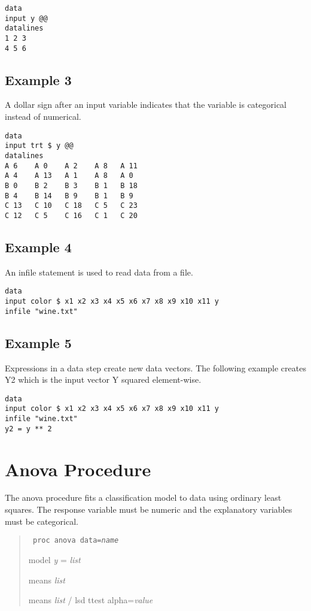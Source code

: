 \documentclass[12pt]{article}
\begin{document}
\begin{Verbatim}
data
input y @@
datalines
1 2 3
4 5 6
\end{Verbatim}

\subsection*{Example 3}
A dollar sign after an input variable indicates that the variable
is categorical instead of numerical.

\begin{Verbatim}
data
input trt $ y @@
datalines
A 6    A 0    A 2    A 8   A 11
A 4    A 13   A 1    A 8   A 0
B 0    B 2    B 3    B 1   B 18
B 4    B 14   B 9    B 1   B 9
C 13   C 10   C 18   C 5   C 23
C 12   C 5    C 16   C 1   C 20
\end{Verbatim}

\subsection*{Example 4}
An infile statement is used to read data from a file.

\begin{Verbatim}
data
input color $ x1 x2 x3 x4 x5 x6 x7 x8 x9 x10 x11 y
infile "wine.txt"
\end{Verbatim}

\subsection*{Example 5}
Expressions in a data step create new data vectors.
The following example creates Y2 which is the input
vector Y squared element-wise.

\begin{Verbatim}
data
input color $ x1 x2 x3 x4 x5 x6 x7 x8 x9 x10 x11 y
infile "wine.txt"
y2 = y ** 2
\end{Verbatim}

\newpage

\section{Anova Procedure}
The anova procedure fits a classification model
to data using ordinary least squares.
The response variable must be numeric and the
explanatory variables must be categorical.

\begin{quote}
{\tt
proc anova data={\it name}

model {\it y} = {\it list}

means {\it list}

means {\it list} / lsd ttest alpha={\it value}
}
\end{quote}
\end{document}

